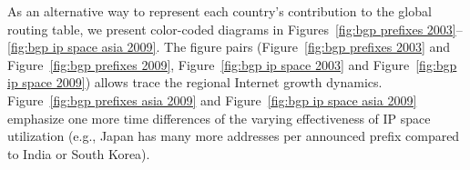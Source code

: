 
As an alternative way to represent each country's contribution to the global
routing table, we present color-coded diagrams in Figures~\ref{fig:bgp
prefixes 2003}--\ref{fig:bgp ip space asia 2009}. The figure pairs
(Figure~\ref{fig:bgp prefixes 2003} and Figure~\ref{fig:bgp prefixes 2009},
Figure~\ref{fig:bgp ip space 2003} and Figure~\ref{fig:bgp ip space 2009})
allows trace the regional Internet growth dynamics. Figure~\ref{fig:bgp
prefixes asia 2009} and Figure~\ref{fig:bgp ip space asia 2009} emphasize one
more time differences of the varying effectiveness of IP space utilization
(e.g., Japan has many more addresses per announced prefix compared to India or
South Korea).




